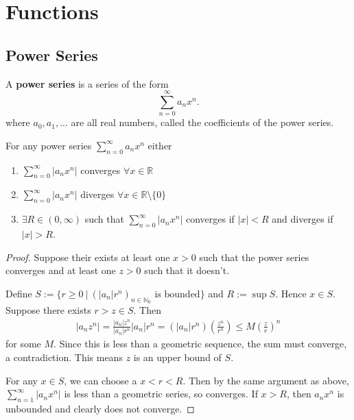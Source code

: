 \section{Functions}
\subsection{Power Series}

\begin{definition}
  A {\bf power series} is a series of the form
    \[\sum_{n=0}^{\infty} a_n x^n.\]
    where $a_0,a_1,...$ are all real numbers, called the coefficients of the power series.
\end{definition}
\begin{theorem}

    For any power series $\sum_{n=0}^{\infty} a_n x^n$ either
    \begin{enumerate}
        \item $\sum_{n=0}^{\infty} | a_n x^n| $ converges $\forall x \in \mathbb{R}$ 
        \item $\sum_{n=0}^{\infty} | a_n x^n| $ diverges $\forall x \in \mathbb{R} \setminus \{0\}$
        \item $\exists R \in (0, \infty)$ such that $\sum_{n=0}^{\infty} | a_n x^n| $ converges if $|x| < R$ and diverges if $|x| > R$.
    \end{enumerate}
    
\end{theorem}
\begin{proof}
  Suppose their exists at least one $x > 0$ such that the power series converges and at least one $z > 0$ such that it doesn't.

  Define $S := \{r \geq 0 \ | \ (|a_n| r^n)_{n \in \mathbb{N}_0} \text{ is bounded}\}$ and $R := \sup S$. Hence $x \in S$. Suppose there exists $r > z \in S$. Then
  \begin{align*}
    |a_n z^n| = \frac{|a_n|z^n}{|a_n|r^n} |a_n| r^n = (|a_n| r^n) \left(\frac{z^n}{r^n}\right) \leq M \left( \frac{z}{r} \right)^n
  \end{align*}
  for some $M$. Since this is less than a geometric sequence, the sum must converge, a contradiction. This means $z$ is an upper bound of $S$.

  For any $x \in S$, we can choose a $x < r < R$. Then by the same argument as above, $\sum_{ n = 1}^{\infty} |a_n x^n|$ is less than a geometric series, so converges. If $x > R$, then $a_n x^n$ is unbounded and clearly does not converge.
  
\end{proof}

